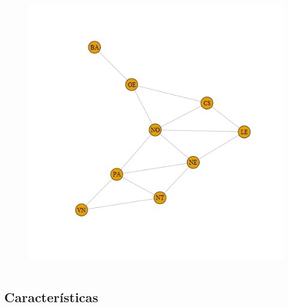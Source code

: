 \begin{frame}
\begin{columns}[t]
\begin{column}{7cm}
\begin{figure}[!htbp]
       	    \includegraphics[scale=0.35]{imagens/grafo.png}
            \end{figure}
        \end{column}
    \end{columns}
\end{frame}


\subsection{Características}

